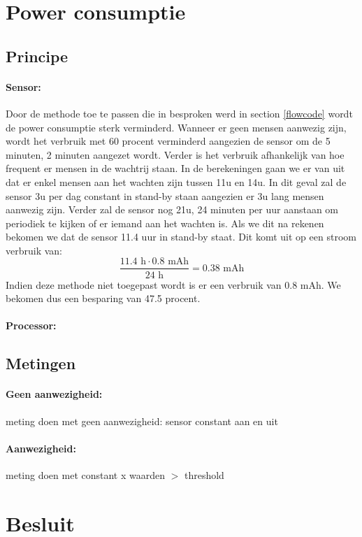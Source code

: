 \documentclass[]{article}
\begin{document}
\section{Power consumptie}

\subsection{Principe}
\paragraph{Sensor: }
Door de methode toe te passen die in besproken werd in section \ref{flowcode} wordt de power consumptie sterk verminderd. Wanneer er geen mensen aanwezig zijn, wordt het verbruik met 60 procent verminderd aangezien de sensor om de 5 minuten, 2 minuten aangezet wordt. Verder is het verbruik afhankelijk van hoe frequent er mensen in de wachtrij staan. In de berekeningen gaan we er van uit dat er enkel mensen aan het wachten zijn tussen 11u en 14u. In dit geval zal de sensor 3u per dag constant in stand-by staan aangezien er 3u lang mensen aanwezig zijn. Verder zal de sensor nog 21u, 24 minuten per uur aanstaan om periodiek te kijken of er iemand aan het wachten is. Als we dit na rekenen bekomen we dat de sensor 11.4 uur in stand-by staat. Dit komt uit op een stroom verbruik van: 
\begin{equation}
	\frac{11.4 \text{ h}\cdot 0.8 \text{ mAh}}{24 \text{ h}} = 0.38 \text{ mAh}
\end{equation}
Indien deze methode niet toegepast wordt is er een verbruik van 0.8 mAh. We bekomen dus een besparing van 47.5 procent. 
\paragraph{Processor: }

\subsection{Metingen}
\paragraph{Geen aanwezigheid: }
meting doen met geen aanwezigheid: sensor constant aan en uit

\paragraph{Aanwezigheid: }
meting doen met constant x waarden $>$ threshold


\section{Besluit }
\end{document}
